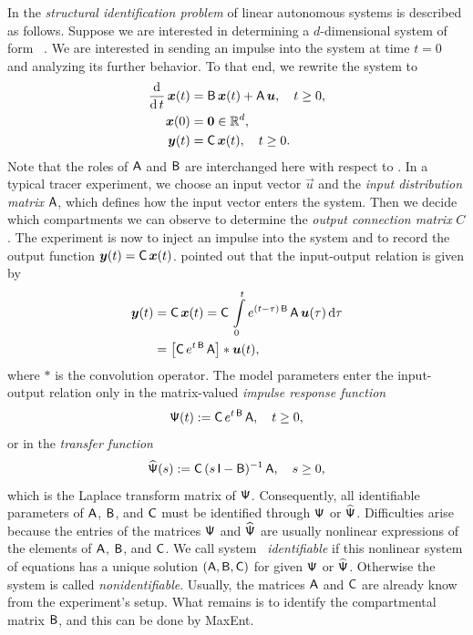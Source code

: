 \documentclass[smallextended]{svjour3}
\makeatletter
\renewcommand*{\eqref}[1]{%
  \hyperref[{#1}]{\textup{\tagform@{\ref*{#1}}}}%
}
\newcommand{\R}{\mathbb{R}}
\newcommand{\intl}{\int\limits}
\newcommand{\deriv}[1]{\frac{\operatorname{d}}{\operatorname{d}#1}}
\newcommand{\dd}[1]{\,\mathrm{d}#1}
\makeatother
\begin{document}
In \citet[Chapter~16]{Anderson1983} the \emph{structural identification problem} of linear autonomous systems is described as follows.
Suppose we are interested in determining a $d$-dimensional system of form~\eqref{eqn:lin_CS_sys}.
We are interested in sending an impulse into the system at time $t=0$ and analyzing its further behavior.
To that end, we rewrite the system to
\begin{equation}\label{eqn:ABC_system}
	\begin{aligned}
		\deriv{t}\,\vec{x}(t) &= \tens{B}\,\vec{x}(t) + \tens{A}\,\vec{u},	\quad t\geq0,\\
		\vec{x}(0) &= \vec{0}\in\R^d,\\
		\vec{y}(t) &= \tens{C}\,\vec{x}(t),\quad t\geq0.
	\end{aligned}
\end{equation}
Note that the roles of $\mathsf{A}$ and $\mathsf{B}$ are interchanged here with respect to \citet{Anderson1983}.
In a typical tracer experiment, we choose an input vector $\vec{u}$ and the \emph{input distribution matrix} $\mathsf{A}$, which defines how the input vector enters the system.
Then we decide which compartments we can observe to determine the \emph{output connection matrix} $C$.
The experiment is now to inject an impulse into the system and to record the output function $\vec{y}(t) =\tens{C}\,\vec{x}(t)$.
\citet{Bellman1970MBS} pointed out that the input-output relation is given by
\begin{align*}
	\vec{y}(t) &= \tens{C}\,\vec{x}(t) = \tens{C}\,\intl_0^t e^{(t-\tau)\,\tens{B}}\,\tens{A}\,\vec{u}(\tau)\dd{\tau}\\
	&= \left[\tens{C}\,e^{t\,\tens{B}}\,\tens{A}\right] * \vec{u}(t),
\end{align*}
where $*$ is the convolution operator.
The model parameters enter the input-output relation only in the matrix-valued \emph{impulse response function}
\begin{equation*}
	\mathsf{\Psi}(t):=\mathsf{C}\,e^{t\,\mathsf{B}}\,\mathsf{A},\quad t\geq0,
\end{equation*}
or in the \emph{transfer function}
\begin{equation*}
	\widehat{\mathsf{\Psi}}(s) := \mathsf{C}\,(s\,\mathsf{I}-\mathsf{B})^{-1}\,\mathsf{A}, \quad s\geq0,
\end{equation*}
which is the Laplace transform matrix of $\mathsf{\Psi}$.
Consequently, all identifiable parameters of $\mathsf{A}$, $\mathsf{B}$, and $\mathsf{C}$ must be identified through $\mathsf{\Psi}$ or $\widehat{\mathsf{\Psi}}$.
Difficulties arise because the entries of the matrices $\mathsf{\Psi}$ and $\widehat{\mathsf{\Psi}}$ are usually nonlinear expressions of the elements of $\mathsf{A}$, $\mathsf{B}$, and $\mathsf{C}$.
We call system~\eqref{eqn:ABC_system} \emph{identifiable} if this nonlinear system of equations has a unique solution $(\mathsf{A},\mathsf{B},\mathsf{C})$ for given $\mathsf{\Psi}$ or $\widehat{\mathsf{\Psi}}$.
Otherwise the system is called \emph{nonidentifiable}.
Usually, the matrices $\mathsf{A}$ and $\mathsf{C}$ are already know from the experiment's setup.
What remains is to identify the compartmental matrix $\mathsf{B}$, and this can be done by MaxEnt.
\end{document}

